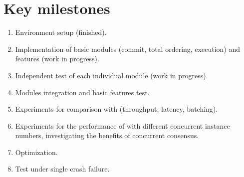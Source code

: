 
\section{Key milestones}
\begin{enumerate}
    \item Environment setup (finished).
    \item Implementation of basic modules (commit, total ordering, execution) and features (work in progress).
    \item Independent test of each individual module (work in progress).
    \item Modules integration and basic features test.
    \item Experiments for comparison with \PBFT{} (throughput, latency, batching).
    \item Experiments for the performance of \RCC{} with different concurrent instance numbers, investigating the benefits of concurrent consensus.
    \item Optimization.
    \item Test under single crash failure.
\end{enumerate}